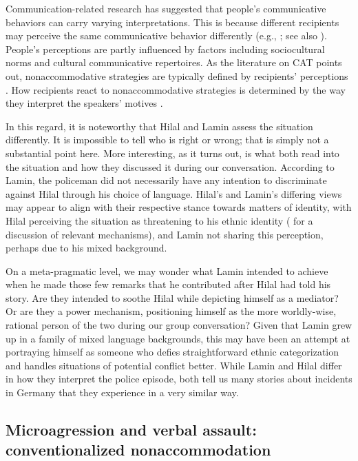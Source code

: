 \documentclass[output=paper,colorlinks,citecolor=brown]{langscibook}
\begin{document}
Communication-related research has suggested that people's communicative behaviors can carry varying interpretations. This is because different recipients may perceive the same communicative behavior differently (e.g., \citealt{dragojevic_gasiorek_giles2016}; see also \citealt{gallois_weatherall_giles2016}). People's perceptions are partly influenced by factors including sociocultural norms and cultural communicative repertoires. As the literature on CAT points out, nonaccommodative strategies are typically defined by recipients' perceptions \citep{gasiorek2016a}. How recipients react to nonaccommodative strategies is determined by the way they interpret the speakers' motives \citep{gasiorek_giles2012}.

In this regard, it is noteworthy that Hilal and Lamin assess the situation differently. It is impossible to tell who is right or wrong; that is simply not a substantial point here. More interesting, as it turns out, is what both read into the situation and how they discussed it during our conversation. According to Lamin, the policeman did not necessarily have any intention to discriminate against Hilal through his choice of language. Hilal's and Lamin's differing views may appear to align with their respective stance towards matters of  identity, with Hilal perceiving the situation as threatening to his ethnic identity (\citealt{bourhis_giles1977} for a discussion of relevant mechanisms), and Lamin not sharing this perception, perhaps due to his mixed background. 

On a meta-pragmatic level, we may wonder what Lamin intended to achieve when he made those few remarks that he contributed after Hilal had told his story. Are they intended to soothe Hilal while depicting himself as a mediator? Or are they a power mechanism, positioning himself as the more worldly-wise, rational person of the two during our group conversation? Given that Lamin grew up in a family of mixed language backgrounds, this may have been an attempt at portraying himself as someone who defies straightforward ethnic categorization and handles situations of potential conflict better. While Lamin and Hilal differ in how they interpret the police episode, both tell us many stories about incidents in Germany that they experience in a very similar way. 

\subsection{Microagression and verbal assault: conventionalized nonaccommodation}\label{CH1.1.ss.4.2}
\end{document}
